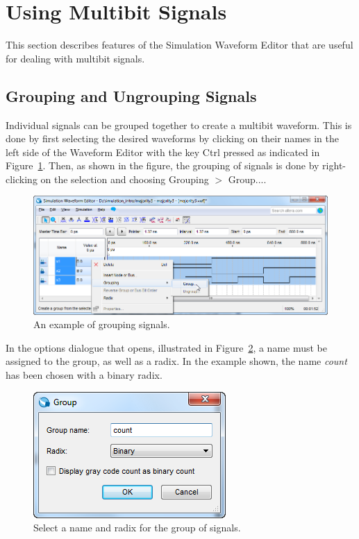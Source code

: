 \documentclass[11pt, twoside, pdftex]{article}
\begin{document}
\section{Using Multibit Signals}
This section describes features of the Simulation Waveform Editor that are useful for 
dealing with multibit signals.

\subsection{Grouping and Ungrouping Signals}
\label{sec:grouping_and_ungrouping}
Individual signals can be grouped together to create a multibit waveform. 
This is done by first selecting the desired waveforms by clicking on their names 
in the left side of the Waveform Editor with the key {\sf Ctrl} pressed as indicated in Figure~\ref{fig:fig21}.
Then, as shown in the figure, the grouping of signals is done by right-clicking on 
the selection and choosing {\sf Grouping $>$ Group...}.
\begin{figure}[H]
   \begin{center}
      \includegraphics[scale=0.65]{figures/appendix/figure21.png}
   \caption{An example of grouping signals.} 
	 \label{fig:fig21}
	 \end{center}
\end{figure}
In the options dialogue that opens, illustrated in Figure~\ref{fig:fig22}, a name must be 
assigned to the group, as well as a radix. In the example shown, the name {\it count} has been 
chosen with a binary radix.
\begin{figure}[H]
   \begin{center}
      \includegraphics[scale=0.65]{figures/appendix/figure22.png}
   \caption{Select a name and radix for the group of signals.} 
	 \label{fig:fig22}
	 \end{center}
\end{figure}
\end{document}
